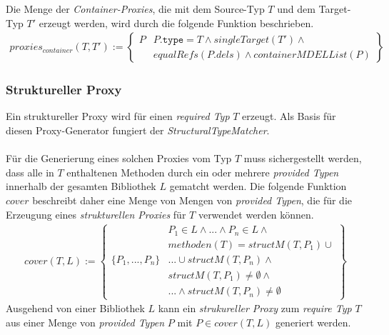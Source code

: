 \documentclass[a4paper,12pt]{article}
\begin{document}
Die Menge der \emph{Container-Proxies}, die mit dem Source-Typ $T$ und dem Target-Typ $T'$ erzeugt werden, wird durch die folgende Funktion beschrieben.
\begin{gather*}
\mathit{proxies_{container}(T,T')} := 
\left\{\begin{array}{l|l}
	P	& P\texttt{.type} = T \wedge  \mathit{singleTarget(T')} \wedge \mathit{ }\\
		& \mathit{equalRefs(P.dels)} \wedge \mathit{containerMDELList(P)} 
		 \end{array}
\right\}
\end{gather*}

\subsubsection{Struktureller Proxy}
Ein struktureller Proxy wird für einen \emph{required Typ} $T$ erzeugt. Als Basis für diesen Proxy-Generator fungiert der \emph{StructuralTypeMatcher}.\\\\
Für die Generierung eines solchen Proxies vom Typ $T$ muss sichergestellt werden, dass alle in $T$ enthaltenen
Methoden durch ein oder mehrere \emph{provided Typen} innerhalb der gesamten Bibliothek $L$ gematcht werden. Die folgende Funktion $\mathit{cover}$ beschreibt daher eine Menge von Mengen von \emph{provided Typen}, die für die Erzeugung eines \emph{strukturellen Proxies} für $T$ verwendet werden können.
\begin{gather*}
cover(T,L) := 
\left\{\begin{array}{l|l}
					& P_1 \in L \wedge \text{...} \wedge P_n \in L \wedge \\
					& methoden(T) = structM(T,P_1) \cup \\
	\{P_1,...,P_n\}	& \texttt{...} \cup structM(T, P_n) \wedge \\
					& \mathit{structM(T,P_1)} \neq \emptyset \wedge \\
					& \texttt{...}\wedge \mathit{structM(T,P_n)} \neq \emptyset 
\end{array}\right\}
\end{gather*}
Ausgehend von einer Bibliothek $L$ kann ein \emph{strukureller Proxy} zum \emph{require Typ} $T$ aus einer Menge von \emph{provided Typen} $P$ mit $P \in \mathit{cover(T,L)}$ generiert werden.
\end{document}
